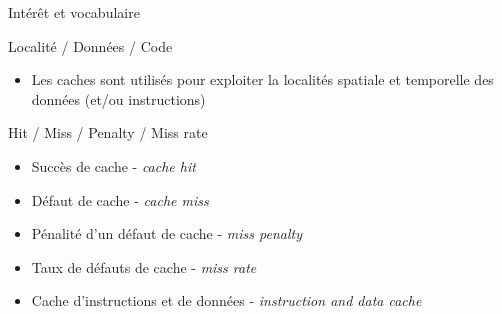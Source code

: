 %
\begin{Frame}{Intérêt et vocabulaire}


      \begin{block}{Localité / Données / Code}
        \begin{itemize}
        \item Les caches sont utilisés pour exploiter la localités
          spatiale et temporelle des données (et/ou instructions)
        \end{itemize}
      \end{block} 


      \begin{block}{Hit / Miss / Penalty / Miss rate}
        \begin{itemize}
        \item Succès de cache - \emph{cache hit}
        \item Défaut de cache - \emph{cache miss}
        \item Pénalité d'un défaut de cache - \emph{miss penalty}
        \item Taux de défauts de cache - \emph{miss rate}
        \item Cache d'instructions et de données - \emph{instruction and data cache}
        \end{itemize}
      \end{block} 
      
\end{Frame}


